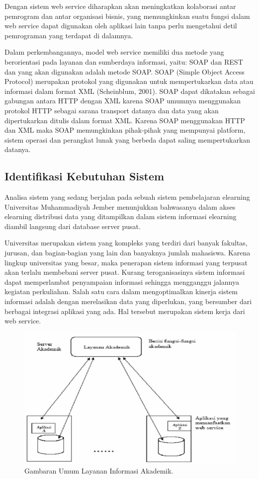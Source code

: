 \documentclass{jtetiproposalskripsi}
\begin{document}
Dengan sistem  web service  diharapkan akan meningkatkan kolaborasi antar pemrogram dan antar organisasi bisnis, yang memungkinkan suatu fungsi dalam web service  dapat digunakan oleh aplikasi lain tanpa perlu mengetahui detil pemrograman yang terdapat di dalamnya. 

Dalam perkembangannya, model  web service  memiliki dua metode yang berorientasi pada layanan dan sumberdaya informasi, yaitu: SOAP dan REST dan yang akan digunakan adalah metode SOAP. 
SOAP (Simple Object Access Protocol) merupakan protokol yang digunakan untuk mempertukarkan data atau informasi dalam format XML (Scheinblum, 2001). SOAP dapat dikatakan sebagai gabungan antara HTTP dengan XML karena SOAP umumnya menggunakan protokol HTTP sebagai sarana transport datanya dan data yang akan dipertukarkan ditulis dalam  format  XML.  Karena  SOAP  menggunakan  HTTP  dan  XML  maka  SOAP  memungkinkan  pihak-pihak  yang mempunyai platform, sistem operasi dan perangkat lunak yang berbeda dapat saling mempertukarkan datanya. 

\subsection{Identifikasi Kebutuhan Sistem}
Analisa sistem yang sedang berjalan pada sebuah sistem pembelajaran elearning Universitas Muhammadiyah Jember menunjukkan bahwasanya dalam akses elearning distribusi data yang ditampilkan dalam sistem informasi elearning diambil langsung dari database server pusat. 

Universitas merupakan sistem yang kompleks yang terdiri dari banyak fakultas, jurusan, dan bagian-bagian yang lain dan banyaknya jumlah mahasiswa. Karena lingkup universitas yang besar, maka penerapan sistem informasi yang terpusat akan terlalu membebani server pusat. Kurang teroganisasinya sistem informasi dapat memperlambat penyampaian informasi sehingga mengganggu jalannya kegiatan  perkuliahan. Salah satu cara dalam mengoptimalkan kinerja sistem informasi adalah dengan merelasikan data yang diperlukan, yang bersumber dari berbagai integrasi aplikasi yang ada. Hal tersebut merupakan sistem kerja dari web service.

\begin{figure}[ht!]
  \centering
    \includegraphics{gambar/server}
    \caption{Gambaran Umum Layanan Informasi Akademik.}
    \label{server}
\end{figure}
\end{document}

